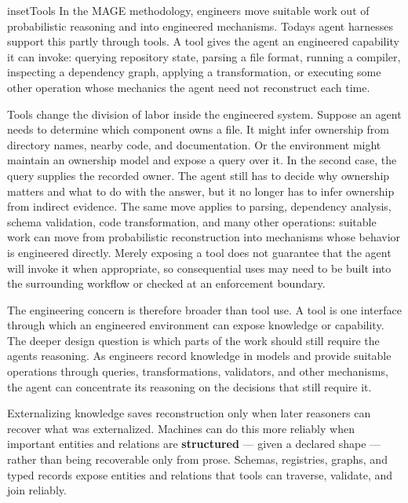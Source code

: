 \begin{bookbox}{inset}{Tools}
\label{inset-tools}
In the MAGE methodology, engineers move suitable work out of probabilistic reasoning and into engineered mechanisms. Today\textquotesingle s agent harnesses support this partly through tools. A tool gives the agent an engineered capability it can invoke: querying repository state, parsing a file format, running a compiler, inspecting a dependency graph, applying a transformation, or executing some other operation whose mechanics the agent need not reconstruct each time.

Tools change the division of labor inside the engineered system. Suppose an agent needs to determine which component owns a file. It might infer ownership from directory names, nearby code, and documentation. Or the environment might maintain an ownership model and expose a query over it. In the second case, the query supplies the recorded owner. The agent still has to decide why ownership matters and what to do with the answer, but it no longer has to infer ownership from indirect evidence. The same move applies to parsing, dependency analysis, schema validation, code transformation, and many other operations: suitable work can move from probabilistic reconstruction into mechanisms whose behavior is engineered directly. Merely exposing a tool does not guarantee that the agent will invoke it when appropriate, so consequential uses may need to be built into the surrounding workflow or checked at an enforcement boundary.

The engineering concern is therefore broader than tool use. A tool is one interface through which an engineered environment can expose knowledge or capability. The deeper design question is which parts of the work should still require the agent\textquotesingle s reasoning. As engineers record knowledge in models and provide suitable operations through queries, transformations, validators, and other mechanisms, the agent can concentrate its reasoning on the decisions that still require it.
\end{bookbox}



Externalizing knowledge saves reconstruction only when later reasoners can recover what was externalized. Machines can do this more reliably when important entities and relations are \textbf{structured} --- given a declared shape --- rather than being recoverable only from prose. Schemas, registries, graphs, and typed records expose entities and relations that tools can traverse, validate, and join reliably.

